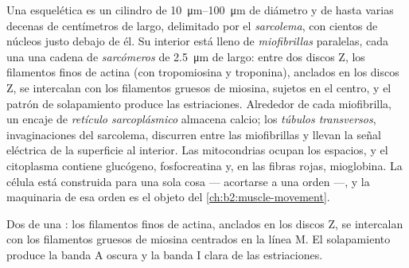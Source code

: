 \begin{definition}\label{def:b2:cell-differentiation:fibre}
Una  esquelética es un cilindro de \qtyrange{10}{100}{\micro m}
de diámetro y de hasta varias decenas de centímetros de largo, delimitado
por el \emph{sarcolema}, con cientos de núcleos justo debajo de él. Su
interior está lleno de \emph{miofibrillas} paralelas, cada una una cadena de
\emph{sarcómeros} de \qty{2.5}{\micro m} de largo: entre dos discos Z, los
filamentos finos de actina (con tropomiosina y troponina), anclados en los
discos Z, se intercalan con los filamentos gruesos de miosina, sujetos en
el centro, y el patrón de solapamiento produce las estriaciones. Alrededor
de cada miofibrilla, un encaje de \emph{retículo sarcoplásmico} almacena
calcio; los \emph{túbulos transversos}, invaginaciones del sarcolema,
discurren entre las miofibrillas y llevan la señal eléctrica de la
superficie al interior. Las mitocondrias ocupan los espacios, y el
citoplasma contiene glucógeno, fosfocreatina y, en las fibras rojas,
mioglobina. La célula está construida para una sola cosa --- acortarse a
una orden ---, y la maquinaria de esa orden es el objeto del
\cref{ch:b2:muscle-movement}.
\end{definition}

\begin{omfigure}

{\small Dos  de una : los filamentos finos de actina,
anclados en los discos Z, se intercalan con los filamentos gruesos de
miosina centrados en la línea M. El solapamiento produce la banda A oscura
y la banda I clara de las estriaciones.}
\end{omfigure}

